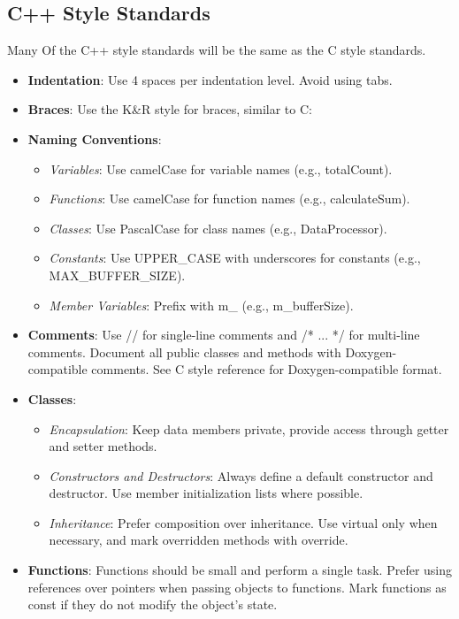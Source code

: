 \documentclass{ol-softwaremanual}
\begin{document}
\subsection{C++ Style Standards}
Many Of the C++ style standards will be the same as the C style standards.
\begin{itemize}
\item \textbf{Indentation}: Use 4 spaces per indentation level. Avoid using tabs.
\item \textbf{Braces}: Use the K\&R style for braces, similar to C:
\item \textbf{Naming Conventions}:
\begin{itemize}
    \item \textit{Variables}: Use camelCase for variable names (e.g., totalCount).
    \item \textit{Functions}: Use camelCase for function names (e.g., calculateSum).
    \item \textit{Classes}: Use PascalCase for class names (e.g., DataProcessor).
    \item \textit{Constants}: Use UPPER\_CASE with underscores for constants (e.g., MAX\_BUFFER\_SIZE).
    \item \textit{Member Variables}: Prefix with m\_ (e.g., m\_bufferSize).
\end{itemize}
\item \textbf{Comments}:
        Use // for single-line comments and /* ... */ for multi-line comments.
        Document all public classes and methods with Doxygen-compatible comments. See C style reference for Doxygen-compatible format.

\item \textbf{Classes}:
\begin{itemize}
        \item \textit{Encapsulation}: Keep data members private, provide access through getter and setter methods.
        \item \textit{Constructors and Destructors}: Always define a default constructor and destructor. Use member initialization lists where possible.
        \item \textit{Inheritance}: Prefer composition over inheritance. Use virtual only when necessary, and mark overridden methods with override.
\end{itemize}
\item \textbf{Functions}:
        Functions should be small and perform a single task.
        Prefer using references over pointers when passing objects to functions.
        Mark functions as const if they do not modify the object’s state.


\end{itemize}
\end{document}
